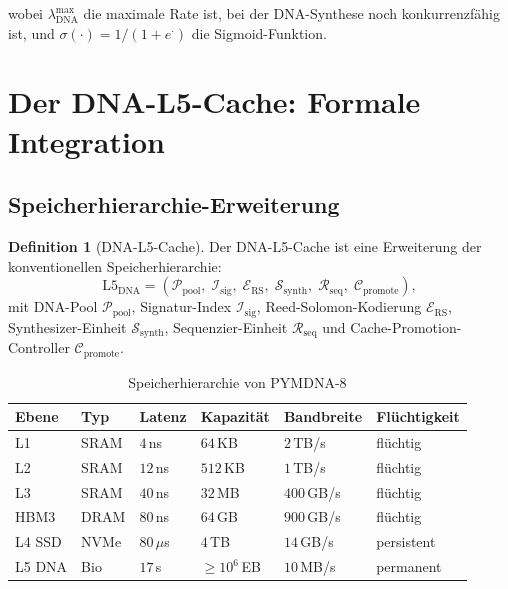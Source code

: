 ﻿\documentclass[a4paper,12pt]{article}
\theoremstyle{definition}
\newtheorem{definition}{Definition}[section]
\begin{document}
wobei $\lambda_{\mathrm{DNA}}^{\mathrm{max}}$ die maximale Rate ist,
bei der DNA-Synthese noch konkurrenzfähig ist, und
$\sigma(\cdot) = 1/(1 + e^\cdot)$ die Sigmoid-Funktion.

\section{Der DNA-L5-Cache: Formale Integration}

\subsection{Speicherhierarchie-Erweiterung}

\begin{definition}[DNA-L5-Cache]
  \label{def:l5_dna}
  Der DNA-L5-Cache ist eine Erweiterung der konventionellen Speicherhierarchie:
  \[
    \mathrm{L5}_{\mathrm{DNA}} = (\mathcal{P}_{\mathrm{pool}},\;
    \mathcal{I}_{\mathrm{sig}},\; \mathcal{E}_{\mathrm{RS}},\;
    \mathcal{S}_{\mathrm{synth}},\; \mathcal{R}_{\mathrm{seq}},\;
    \mathcal{C}_{\mathrm{promote}}),
  \]
  mit DNA-Pool $\mathcal{P}_{\mathrm{pool}}$, Signatur-Index $\mathcal{I}_{\mathrm{sig}}$,
  Reed-Solomon-Kodierung $\mathcal{E}_{\mathrm{RS}}$, Synthesizer-Einheit
  $\mathcal{S}_{\mathrm{synth}}$, Sequenzier-Einheit $\mathcal{R}_{\mathrm{seq}}$
  und Cache-Promotion-Controller $\mathcal{C}_{\mathrm{promote}}$.
\end{definition}

\begin{table}[H]
  \centering
  \caption{Speicherhierarchie von PYMDNA-8}
  \label{tab:hierarchy}
  \renewcommand{\arraystretch}{1.35}
  \begin{tabular}{llllll}
    \toprule
    \textbf{Ebene} & \textbf{Typ} & \textbf{Latenz} & \textbf{Kapazität}
    & \textbf{Bandbreite} & \textbf{Flüchtigkeit} \\
    \midrule
    L1  & SRAM  & $4$\,ns    & $64$\,KB    & $2$\,TB/s  & flüchtig \\
    L2  & SRAM  & $12$\,ns   & $512$\,KB   & $1$\,TB/s  & flüchtig \\
    L3  & SRAM  & $40$\,ns   & $32$\,MB    & $400$\,GB/s & flüchtig \\
    HBM3 & DRAM  & $80$\,ns   & $64$\,GB    & $900$\,GB/s & flüchtig \\
    L4 SSD & NVMe & $80$\,$\mu$s & $4$\,TB   & $14$\,GB/s & persistent \\
    L5 DNA & Bio  & $17$\,s    & $\ge 10^6$\,EB & $10$\,MB/s & permanent \\
    \bottomrule
  \end{tabular}
\end{table}
\end{document}
